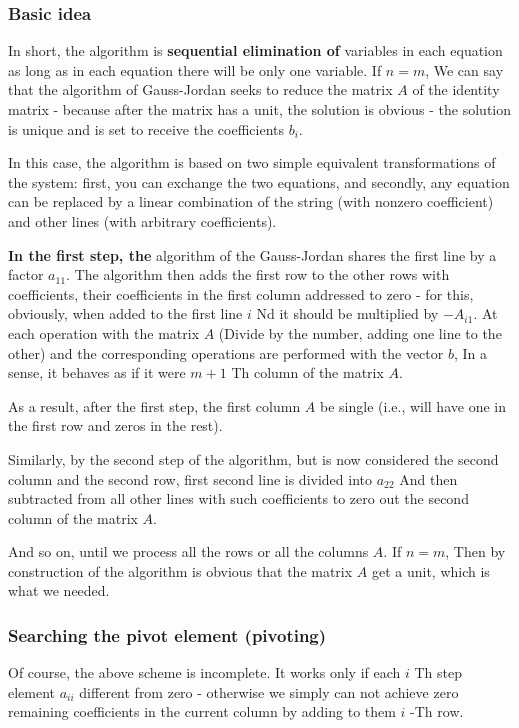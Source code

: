 \subsubsection{ Basic idea }

In short, the algorithm is \textbf{sequential elimination of} variables in each equation as long as in each equation there will be only one variable. If $n = m$, We can say that the algorithm of Gauss-Jordan seeks to reduce the matrix $A$ of the identity matrix - because after the matrix has a unit, the solution is obvious - the solution is unique and is set to receive the coefficients $b_i$.

In this case, the algorithm is based on two simple equivalent transformations of the system: first, you can exchange the two equations, and secondly, any equation can be replaced by a linear combination of the string (with nonzero coefficient) and other lines (with arbitrary coefficients).

\textbf{In the first step, the} algorithm of the Gauss-Jordan shares the first line by a factor $a_ {11}$. The algorithm then adds the first row to the other rows with coefficients, their coefficients in the first column addressed to zero - for this, obviously, when added to the first line $i$ Nd it should be multiplied by $-A_ {i1}$. At each operation with the matrix $A$ (Divide by the number, adding one line to the other) and the corresponding operations are performed with the vector $b$, In a sense, it behaves as if it were $m +1$ Th column of the matrix $A$.

As a result, after the first step, the first column $A$ be single (i.e., will have one in the first row and zeros in the rest).

Similarly, by the second step of the algorithm, but is now considered the second column and the second row, first second line is divided into $a_ {22}$ And then subtracted from all other lines with such coefficients to zero out the second column of the matrix $A$.

And so on, until we process all the rows or all the columns $A$. If $n = m$, Then by construction of the algorithm is obvious that the matrix $A$ get a unit, which is what we needed.

\subsubsection{ Searching the pivot element (pivoting) }

Of course, the above scheme is incomplete. It works only if each $i$ Th step element $a_ {ii}$ different from zero - otherwise we simply can not achieve zero remaining coefficients in the current column by adding to them $i$ -Th row.

